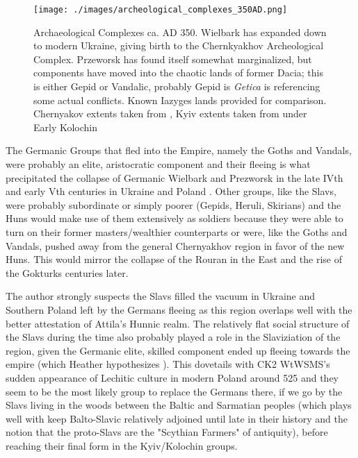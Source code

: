\documentclass{article}
\begin{document}
	\begin{figure}[h!]
		\centering
		\texttt{[image: ./images/archeological\_complexes\_350AD.png]}
		\caption{Archaeological Complexes ca. AD 350.
		\newline\tiny Wielbark has expanded down to modern Ukraine, giving birth to the Chernkyakhov Archeological Complex.
		Przeworsk has found itself somewhat marginalized, but components have moved into the chaotic lands of former Dacia; this is either Gepid or Vandalic, probably Gepid is \textit{Getica} is referencing some actual conflicts. Known Iazyges lands provided for comparison. Chernyakov extents taken from \cite{HeatherEmpiresAndBarbarians,IndoEuroEncyclopedia}, Kyiv extents taken from \cite{IndoEuroEncyclopedia} under Early Kolochin}
	\end{figure}
	
	The Germanic Groups that fled into the Empire, namely the Goths and Vandals, were probably an elite, aristocratic component and their fleeing is what precipitated the collapse of Germanic Wielbark and Prezworsk in the late IVth and early Vth centuries in Ukraine and Poland \cite{HeatherEmpiresAndBarbarians}.
	Other groups, like the Slavs, were probably subordinate or simply poorer (Gepids, Heruli, Skirians) and the Huns would make use of them extensively as soldiers because they were able to turn on their former masters/wealthier counterparts or were, like the Goths and Vandals, pushed away from the general Chernyakhov region in favor of the new Huns.
	This would mirror the collapse of the Rouran in the East and the rise of the Gokturks centuries later.
	
	The author strongly suspects the Slavs filled the vacuum in Ukraine and Southern Poland left by the Germans fleeing as this region overlaps well with the better attestation of Attila’s Hunnic realm.
	The relatively flat social structure of the Slavs during the time also probably played a role in the Slaviziation of the region, given the Germanic elite, skilled component ended up fleeing towards the empire (which Heather hypothesizes \cite{HeatherEmpiresAndBarbarians}).
	This dovetails with CK2 WtWSMS’s sudden appearance of Lechitic culture in modern Poland around 525 and they seem to be the most likely group to replace the Germans there, if we go by the Slavs living in the woods between the Baltic and Sarmatian peoples (which plays well with keep Balto-Slavic relatively adjoined until late in their history and the notion that the proto-Slavs are the "Scythian Farmers" of antiquity), before reaching their final form in the Kyiv/Kolochin groups.
	
\end{document}
